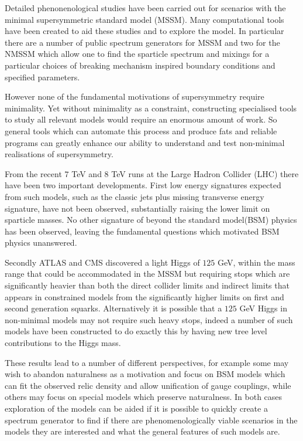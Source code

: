 \documentclass[final,3p,times,pdflatex]{elsarticle}
\begin{document}
Detailed phenonenological studies have been carried out for scenarios
with the minimal supersymmetric standard model (MSSM). Many
computational tools have been created to aid these studies and to
explore the model. In particular there are a number of public spectrum
generators for MSSM\cite{Allanach:2001kg,Porod:2003um,Djouadi:2002ze,Baer:1993ae} and two for the NMSSM\cite{Ellwanger:2006rn,Allanach:nmssm} which allow
one to find the sparticle spectrum and mixings for a particular
choices of breaking mechanism inspired boundary conditions and
specified parameters.

However none of the fundamental motivations of supersymmetry require
minimality. Yet without minimality as a constraint, constructing
specialised tools to study all relevant models would require an
enormous amount of work.  So general tools which can automate this
process and produce fats and reliable programs can greatly enhance our
ability to understand and test non-minimal realisations of
supersymmetry.

From the recent $7$ TeV and $8$ TeV runs at the Large Hadron Collider
(LHC) there have been two important developments.  First low energy
signatures expected from such models, such as the classic jets plus
missing transverse energy signature, have not been observed,
substantially raising the lower limit on sparticle masses\cite{}. No
other signature of beyond the standard model(BSM) physics has been
observed, leaving the fundamental questions which motivated BSM
physics unanswered.

 Secondly ATLAS and CMS discovered\cite{} a light Higgs of $125$ GeV,
 within the mass range that could be accommodated in the MSSM but
 requiring stops which are significantly heavier than both the direct
 collider limits and indirect limits that appears in constrained
 models from the significantly higher limits on first and second
 generation squarks.  Alternatively it is possible that a $125$ GeV
 Higgs in non-minimal models may not require such heavy stops, indeed
 a number of such models have been constructed to do exactly this by
 having new tree level contributions to the Higgs mass.

These results lead to a number of different perspectives, for example
some may wish to abandon naturalness as a motivation and focus on BSM
models which can fit the observed relic density and allow unification
of gauge couplings, while others may focus on special models which
preserve naturalness.  In both cases exploration of the models can be
aided if it is possible to quickly create a spectrum generator to find
if there are phenomenologically viable scenarios in the models they
are interested and what the general features of such models are.
\end{document}
